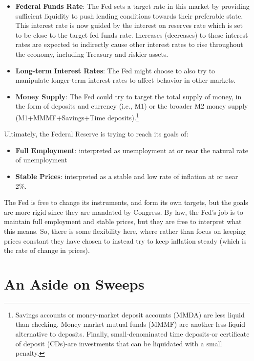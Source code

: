 \documentclass[
]{book}
\providecommand{\tightlist}{%
  \setlength{\itemsep}{0pt}\setlength{\parskip}{0pt}}
\begin{document}
\begin{itemize}
\tightlist
\item
  \textbf{Federal Funds Rate}: The Fed sets a target rate in this market by providing sufficient liquidity to push lending conditions towards their preferable state. This interest rate is now guided by the interest on reserves rate which is set to be close to the target fed funds rate. Increases (decreases) to these interest rates are expected to indirectly cause other interest rates to rise throughout the economy, including Treasury and riskier assets.
\item
  \textbf{Long-term Interest Rates}: The Fed might choose to also try to manipulate longer-term interest rates to affect behavior in other markets.
\item
  \textbf{Money Supply}: The Fed could try to target the total supply of money, in the form of deposits and currency (i.e., M1) or the broader M2 money supply (M1+MMMF+Savings+Time deposits).\footnote{Savings accounts or money-market deposit accounts (MMDA) are less liquid than checking. Money market mutual funds (MMMF) are another less-liquid alternative to deposits. Finally, small-denominated time deposits-or certificate of deposit (CDs)-are investments that can be liquidated with a small penalty.}
\end{itemize}

Ultimately, the Federal Reserve is trying to reach its goals of:

\begin{itemize}
\tightlist
\item
  \textbf{Full Employment}: interpreted as unemployment at or near the natural rate of unemployment
\item
  \textbf{Stable Prices}: interpreted as a stable and low rate of inflation at or near 2\%.
\end{itemize}

The Fed is free to change its instruments, and form its own targets, but the goals are more rigid since they are mandated by Congress. By law, the Fed's job is to maintain full employment and stable prices, but they are free to interpret what this means. So, there is some flexibility here, where rather than focus on keeping prices constant they have chosen to instead try to keep inflation steady (which is the rate of change in prices).

\hypertarget{an-aside-on-sweeps}{%
\section{An Aside on Sweeps}\label{an-aside-on-sweeps}}
\end{document}
